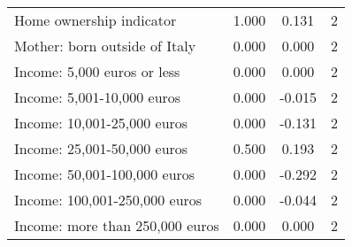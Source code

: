 \begin{table}[htbp]
\begin{tabular}{l*{1}{ccc}}
Home ownership indicator&       1.000         &       0.131&           2\\
Mother: born outside of Italy&       0.000         &       0.000&           2\\
Income: 5,000 euros or less&       0.000         &       0.000&           2\\
Income: 5,001-10,000 euros&       0.000         &      -0.015&           2\\
Income: 10,001-25,000 euros&       0.000         &      -0.131&           2\\
Income: 25,001-50,000 euros&       0.500         &       0.193&           2\\
Income: 50,001-100,000 euros&       0.000         &      -0.292&           2\\
Income: 100,001-250,000 euros&       0.000         &      -0.044&           2\\
Income: more than 250,000 euros&       0.000         &       0.000&           2\\
\bottomrule
\end{tabular}
\end{table}
